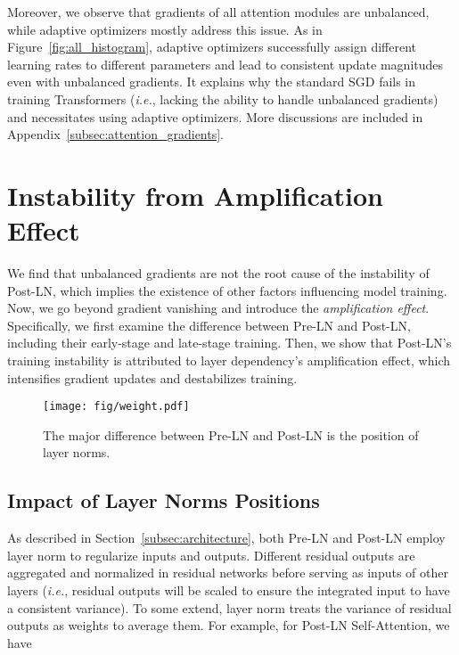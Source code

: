 \documentclass[11pt,a4paper]{article}
\newcommand{\ie}{\textit{i.e.}}
\begin{document}
Moreover, we observe
that gradients of all attention modules are unbalanced, while adaptive optimizers mostly address this issue.
As in Figure~\ref{fig:all_histogram}, adaptive optimizers successfully assign different learning rates to different parameters and lead to consistent update magnitudes even with unbalanced gradients.
It explains why the standard SGD fails in training Transformers (\ie, lacking the ability to handle unbalanced gradients) and necessitates using adaptive optimizers. 
More discussions are included in Appendix~\ref{subsec:attention_gradients}. 

 

\section{Instability from Amplification Effect}
\label{sec:layer-dependency}

We find that unbalanced gradients are not the root cause of the instability of Post-LN, which implies the existence of other factors influencing model training.
Now, we go beyond gradient vanishing and introduce the \emph{amplification effect}.
Specifically, we first examine the difference between Pre-LN and Post-LN, including their early-stage and late-stage training. 
Then, we show that Post-LN's training instability is attributed to layer dependency's amplification effect, which intensifies gradient updates and destabilizes training.



\begin{figure}[t]
\centering
\texttt{[image: fig/weight.pdf]}
\caption{
The major difference between Pre-LN and Post-LN is the position of layer norms. 
}
\label{fig:layer-norm-position}
\end{figure}

\subsection{Impact of Layer Norms Positions}
\label{subsec:impact-ln}

As described in Section~\ref{subsec:architecture}, both Pre-LN and Post-LN employ layer norm to regularize inputs and outputs. 
Different residual outputs are aggregated and normalized in residual networks before serving as inputs of other layers (\ie, residual outputs will be scaled to ensure the integrated input to have a consistent variance). 
To some extend, layer norm treats the variance of residual outputs as weights to average them.
For example, for Post-LN Self-Attention, we have
\end{document}
